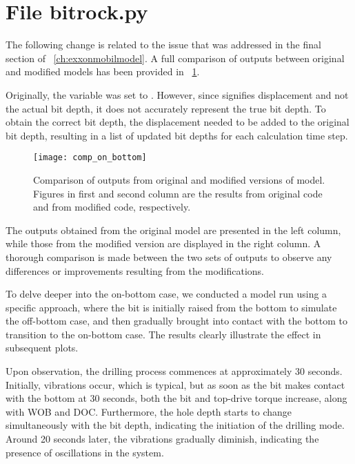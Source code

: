 \section{File {\codefont bitrock.py}}
The following change is related to the issue that was addressed in the final section of \chaptername~\ref{ch:exxonmobilmodel}.
A full comparison of outputs between original and modified models has been provided in \figurename~\ref{Comaprison_on_bottom}.
\begin{codemodifications}

\begin{codemodification}{29}
Originally, the variable  was set to . However, since  signifies displacement and not the actual bit depth, it does not accurately represent the true bit depth. To obtain the correct bit depth, the displacement needed to be added to the original bit depth, resulting in a list of updated bit depths for each calculation time step.
\end{codemodification}

\end{codemodifications} 

\begin{figure}
  \centering
  \texttt{[image: comp\_on\_bottom]}
  \caption[Output comparison or original and modified model]{Comparison of outputs from original and modified versions of model. Figures in first and second column are the results from original code and from modified code, respectively.}\label{Comaprison_on_bottom}
\end{figure}

The outputs obtained from the original model are presented in the left column, while those from the modified version are displayed in the right column. A thorough comparison is made between the two sets of outputs to observe any differences or improvements resulting from the modifications. 

To delve deeper into the on-bottom case, we conducted a model run using a specific approach, where the bit is initially raised from the bottom to simulate the off-bottom case, and then gradually brought into contact with the bottom to transition to the on-bottom case. The results clearly illustrate the effect in subsequent plots.

Upon observation, the drilling process commences at approximately 30 seconds. Initially, vibrations occur, which is typical, but as soon as the bit makes contact with the bottom at 30 seconds, both the bit and top-drive torque increase, along with WOB and DOC. Furthermore, the hole depth starts to change simultaneously with the bit depth, indicating the initiation of the drilling mode. Around 20 seconds later, the vibrations gradually diminish, indicating the presence of oscillations in the system.
